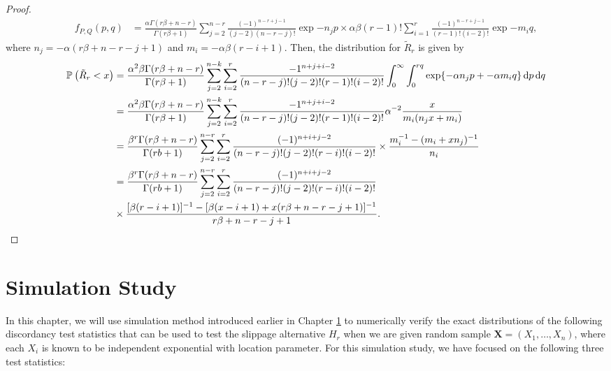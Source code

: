 \documentclass{report}
\begin{document}
\begin{proof}
    \begin{align*}
        f_{P,Q}(p,q) &= \frac{\alpha \Gamma(r \beta + n -r)}{\Gamma (r \beta +1)} \sum_{j=2}^{n-r} \frac{(-1)^{n-r+j-1}}{(j-2)(n-r-j)!} \exp{-n_jp} \times \alpha \beta(r-1)! \sum_{i=1}^r \frac{(-1)^{n-r+j-1}}{(r-1)!(i-2)!}\exp{-m_iq},
    \end{align*}
    where $n_j = -\alpha(r \beta + n -r - j+ 1)$ and $m_i = -\alpha \beta(r-i+1)$. Then, the distribution
    for $\tilde R_r$ is given by
    \begin{align*}
        \mathbb{P}_{} \left( \tilde R_r< x \right) &= \frac{\alpha ^2\beta \Gamma(r \beta + n -r )}{\Gamma(r \beta +1)} \sum_{j=2}^{n-k} \sum_{i=2}^r \frac{-1^{n+j+i-2}}{(n-r-j)!(j-2)!(r-1)!(i-2)!} \int_0^\infty \int_0^{rq} \exp{-\alpha n_j p + -\alpha m_i q} \dd{p} \dd{q}
        \\
        &= \frac{\alpha^2 \beta \Gamma(r \beta + n -r )}{\Gamma(r \beta +1)} \sum_{j=2}^{n-k} \sum_{i=2}^r \frac{-1^{n+j+i-2}}{(n-r-j)!(j-2)!(r-1)!(i-2)!} \alpha^{-2} \frac{x}{m_i(n_jx +m_i)}
        \\
        &= \frac{\beta^{r}\Gamma(r\beta+n-r)}{\Gamma(rb+1)} \sum_{j=2}^{n-r} \sum_{i=2}^r  \frac{(-1)^{n+i+j-2}}{(n-r-j)!(j-2)!(r-i)!(i-2)!} \times \frac{m_i^{-1} - ( m_i + x n_j)^{-1}}{n_i}
        \\
        & \begin{aligned}[t]
            &= \frac{\beta^{r}\Gamma(r\beta+n-r)}{\Gamma(rb+1)} \sum_{j=2}^{n-r} \sum_{i=2}^r  \frac{(-1)^{n+i+j-2}}{(n-r-j)!(j-2)!(r-i)!(i-2)!}
            \\
            & \times \frac{[ \beta(r -i+1)]^{-1} - [\beta(x-i+1) + x(r\beta + n -r -j +1)]^{-1}}{r\beta + n -r - j+ 1}.
        \end{aligned}
    \end{align*}

\end{proof}


\chapter{Simulation Study} \label{chapt: Simulation Study}

In this chapter, we will use simulation method introduced earlier in Chapter \ref{chapt: Simulation Study} to numerically verify the exact distributions of the following discordancy test statistics
that can be used to test the slippage alternative $H_r$ when we are given random sample $\mathbf X = (X_1,\ldots, X_n)$, where each $X_i$ is known to be
independent exponential with location parameter. For this simulation study, we have focused on the following three test statistics:
\end{document}
